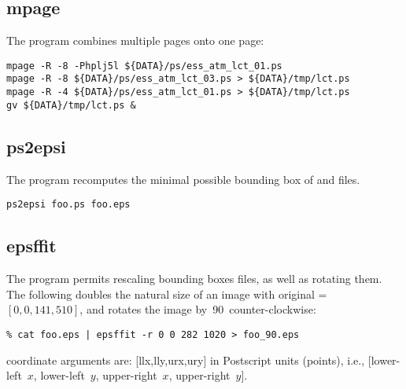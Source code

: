 \documentclass[12pt]{article}
\begin{document}
\subsection{mpage}\label{sxn:mpage}
The  program combines multiple pages onto one page:
\begin{verbatim}
mpage -R -8 -Phplj5l ${DATA}/ps/ess_atm_lct_01.ps
mpage -R -8 ${DATA}/ps/ess_atm_lct_03.ps > ${DATA}/tmp/lct.ps
mpage -R -4 ${DATA}/ps/ess_atm_lct_01.ps > ${DATA}/tmp/lct.ps
gv ${DATA}/tmp/lct.ps &
\end{verbatim}

\subsection[ps2epsi]{ps2epsi}\label{sxn:ps2epsi}
The  program recomputes the minimal possible bounding
box of  and  files.
\begin{verbatim}
ps2epsi foo.ps foo.eps
\end{verbatim}

\subsection[epsffit]{epsffit}\label{sxn:epsffit}
The  program permits rescaling bounding boxes
 files, as well as rotating them.
The following doubles the natural size of an image with original
 = $[0,0,141,510]$, and rotates the image
by~90\dgr\ counter-clockwise:
\begin{verbatim}
% cat foo.eps | epsffit -r 0 0 282 1020 > foo_90.eps
\end{verbatim}
 coordinate arguments are: [llx,lly,urx,ury] in 
Postscript units (points), i.e., 
[lower-left~$x$, lower-left~$y$, upper-right~$x$, upper-right~$y$].
\end{document}
